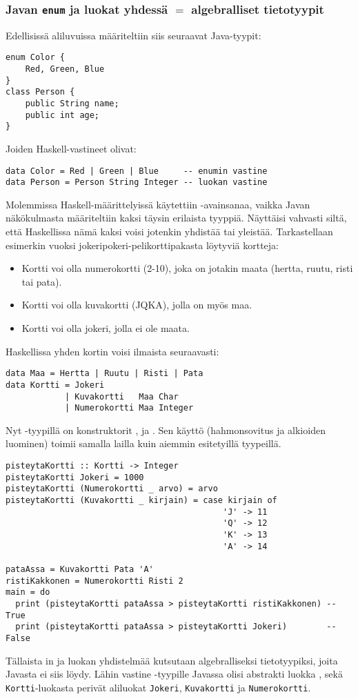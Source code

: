 \subsubsection{Javan \texttt{enum} ja luokat yhdessä $=$ algebralliset tietotyypit}
Edellisissä aliluvuissa määriteltiin siis seuraavat Java-tyypit:
\begin{verbatim}
enum Color {
    Red, Green, Blue
}
class Person {
    public String name;
    public int age;
}
\end{verbatim}
Joiden Haskell-vastineet olivat:
\begin{verbatim}
data Color = Red | Green | Blue     -- enumin vastine
data Person = Person String Integer -- luokan vastine
\end{verbatim}
Molemmissa Haskell-määrittelyissä käytettiin -avainsanaa,
vaikka Javan näkökulmasta määriteltiin kaksi täysin erilaista tyyppiä.
Näyttäisi vahvasti siltä, että Haskellissa nämä kaksi voisi jotenkin yhdistää tai yleistää.
Tarkastellaan esimerkin vuoksi jokeripokeri-pelikorttipakasta löytyviä kortteja:
\begin{itemize}
    \item Kortti voi olla numerokortti (2-10), joka on jotakin maata (hertta, ruutu, risti tai pata).
    \item Kortti voi olla kuvakortti (JQKA), jolla on myös maa.
    \item Kortti voi olla jokeri, jolla ei ole maata.
\end{itemize}
Haskellissa yhden kortin voisi ilmaista seuraavasti:
\begin{verbatim}
data Maa = Hertta | Ruutu | Risti | Pata
data Kortti = Jokeri
            | Kuvakortti   Maa Char
            | Numerokortti Maa Integer
\end{verbatim}
Nyt -tyypillä on konstruktorit ,  ja .
Sen käyttö (hahmonsovitus ja alkioiden luominen) toimii samalla lailla kuin aiemmin esitetyillä tyypeillä.
\begin{verbatim}
pisteytaKortti :: Kortti -> Integer
pisteytaKortti Jokeri = 1000
pisteytaKortti (Numerokortti _ arvo) = arvo
pisteytaKortti (Kuvakortti _ kirjain) = case kirjain of
                                            'J' -> 11
                                            'Q' -> 12
                                            'K' -> 13
                                            'A' -> 14

pataAssa = Kuvakortti Pata 'A'
ristiKakkonen = Numerokortti Risti 2
main = do
  print (pisteytaKortti pataAssa > pisteytaKortti ristiKakkonen) -- True
  print (pisteytaKortti pataAssa > pisteytaKortti Jokeri)        -- False
\end{verbatim}
Tällaista in ja luokan yhdistelmää kutsutaan algebralliseksi tietotyypiksi,
joita Javasta ei siis löydy.
Lähin vastine -tyypille Javassa olisi abstrakti luokka ,
sekä \texttt{Kortti}-luokasta perivät aliluokat \texttt{Jokeri}, \texttt{Kuvakortti} ja \texttt{Numerokortti}.

